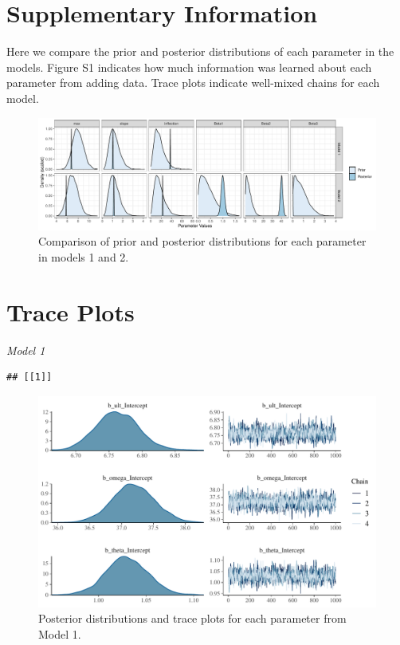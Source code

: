 \documentclass[
]{article}
\begin{document}
\hypertarget{supplementary-information}{%
\section{Supplementary Information}\label{supplementary-information}}

Here we compare the prior and posterior distributions of each parameter in the models. Figure S1 indicates how much information was learned about each parameter from adding data. Trace plots indicate well-mixed chains for each model.

\begin{figure}
\centering
\includegraphics{test_files/figure-latex/unnamed-chunk-5-1.pdf}
\caption{\label{fig:unnamed-chunk-5}Comparison of prior and posterior distributions for each parameter in models 1 and 2.}
\end{figure}

\hypertarget{trace-plots}{%
\section{Trace Plots}\label{trace-plots}}

\emph{Model 1}

\begin{verbatim}
## [[1]]
\end{verbatim}

\begin{figure}
\centering
\includegraphics{test_files/figure-latex/unnamed-chunk-6-1.pdf}
\caption{\label{fig:unnamed-chunk-6}Posterior distributions and trace plots for each parameter from Model 1.}
\end{figure}
\end{document}
